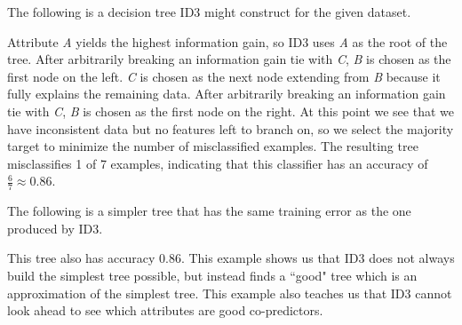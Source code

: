 \documentclass[solution, letterpaper]{cs121}
\begin{document}
\subproblem The following is a decision tree ID3 might construct for the given dataset.

\begin{center}
\end{center}

Attribute \emph{A} yields the highest information gain, so ID3 uses \emph{A} as the root of the tree. After arbitrarily breaking an information gain tie with \emph{C}, \emph{B} is chosen as the first node on the left. \emph{C} is chosen as the next node extending from \emph{B} because it fully explains the remaining data. After arbitrarily breaking an information gain tie with \emph{C}, \emph{B} is chosen as the first node on the right. At this point we see that we have inconsistent data but no features left to branch on, so we select the majority target to minimize the number of misclassified examples. The resulting tree misclassifies 1 of 7 examples, indicating that this classifier has an accuracy of $\frac{6}{7} \approx 0.86$.


\subproblem The following is a simpler tree that has the same training error as the one produced by ID3.

\begin{center}
\end{center}

This tree also has accuracy 0.86. This example shows us that ID3 does not always build the simplest tree possible, but instead finds a ``good" tree which is an approximation of the simplest tree. This example also teaches us that ID3 cannot look ahead to see which attributes are good co-predictors. 
\end{document}
